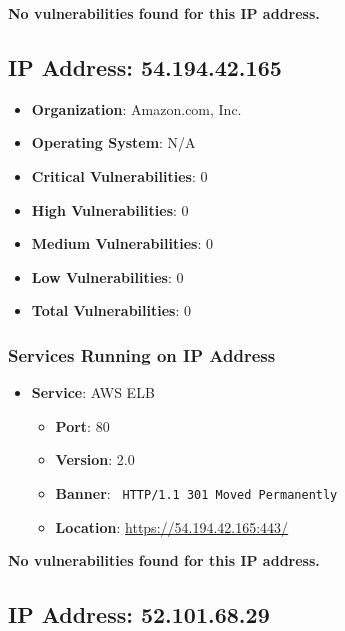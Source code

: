 \documentclass{article}
\begin{document}
\textbf{No vulnerabilities found for this IP address.}




\clearpage



\subsection*{IP Address: 54.194.42.165}

\begin{itemize}
    \item \textbf{Organization}: Amazon.com, Inc.
    \item \textbf{Operating System}:  N/A 
    \item \textbf{Critical Vulnerabilities}: 0
    \item \textbf{High Vulnerabilities}: 0
    \item \textbf{Medium Vulnerabilities}: 0
    \item \textbf{Low Vulnerabilities}: 0
    \item \textbf{Total Vulnerabilities}: 0
\end{itemize}

\subsubsection*{Services Running on IP Address}

\begin{itemize}
    
        \item \textbf{Service}: AWS ELB
        \begin{itemize}
            \item \textbf{Port}: 80
            \item \textbf{Version}:  2.0 
            \item \textbf{Banner}: \texttt{
                HTTP/1.1 301 Moved Permanently
            }
            \item \textbf{Location}: \href{ https://54.194.42.165:443/ }{ https://54.194.42.165:443/ }
        \end{itemize}
    
\end{itemize}


\textbf{No vulnerabilities found for this IP address.}




\clearpage



\subsection*{IP Address: 52.101.68.29}
\end{document}
